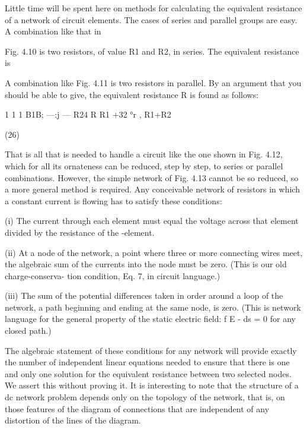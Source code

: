 Little time will be spent here on methods for calculating the
equivalent resistance of a network of circuit elements. The cases of
series and parallel groups are easy. A combination like that in

Fig. 4.10 is two resistors, of value R1 and R2, in series. The equivalent
resistance is

  

 

A combination like Fig. 4.11 is two resistors in parallel. By an argument
that you should be able to give, the equivalent resistance R is
found as follows:

1 1 1 B1B;
---:j --- R24
R R1 +32 °r , R1+R2

(26)
\begin{equation}
\end{equation}

That is all that is needed to handle a circuit like the one shown in
Fig. 4.12, which for all its ornateness can be reduced, step by step,
to series or parallel combinations. However, the simple network of
Fig. 4.13 cannot be so reduced, so a more general method is required.
Any conceivable network of resistors in which a constant current is
flowing has to satisfy these conditions:

(i) The current through each element must equal the voltage
across that element divided by the resistance of the
-element.

(ii) At a node of the network, a point where three or more connecting
wires meet, the algebraic sum of the currents into
the node must be zero. (This is our old charge-conserva-
tion condition, Eq. 7, in circuit language.)

(iii) The sum of the potential differences taken in order around
a loop of the network, a path beginning and ending at the
same node, is zero. (This is network language for the
general property of the static electric field: f E - ds = 0 for
any closed path.)

The algebraic statement of these conditions for any network will
provide exactly the number of independent linear equations needed
to ensure that there is one and only one solution for the equivalent
resistance between two selected nodes. We assert this without proving
it. It is interesting to note that the structure of a dc network
problem depends only on the topology of the network, that is, on
those features of the diagram of connections that are independent
of any distortion of the lines of the diagram.

